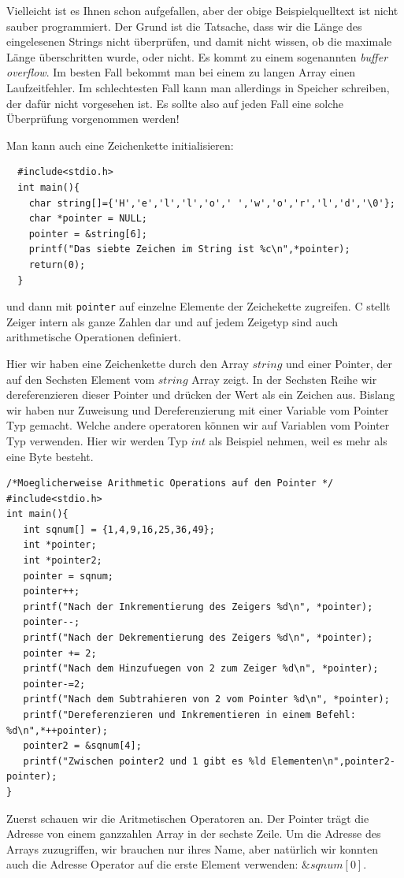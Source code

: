 Vielleicht ist es Ihnen schon aufgefallen, aber der obige Beispielquelltext ist nicht sauber programmiert.
Der Grund ist die Tatsache, dass wir die Länge des eingelesenen Strings nicht überprüfen, und damit nicht wissen, ob die maximale Länge überschritten wurde, oder nicht.
Es kommt zu einem sogenannten \emph{buffer overflow}.
Im besten Fall bekommt man bei einem zu langen Array einen Laufzeitfehler. 
Im schlechtesten Fall kann man allerdings in Speicher schreiben, der dafür nicht vorgesehen ist.
Es sollte also auf jeden Fall eine solche Überprüfung vorgenommen werden!

Man kann auch eine Zeichenkette initialisieren:
\begin{lstlisting}
  #include<stdio.h>
  int main(){
    char string[]={'H','e','l','l','o',' ','w','o','r','l','d','\0'};
    char *pointer = NULL;
    pointer = &string[6];
    printf("Das siebte Zeichen im String ist %c\n",*pointer);
    return(0);
  }
\end{lstlisting} 
und dann mit \verb|pointer| auf einzelne Elemente der Zeichekette zugreifen.
C stellt Zeiger intern als ganze Zahlen dar und auf jedem Zeigetyp sind auch arithmetische Operationen definiert.

Hier wir haben eine Zeichenkette durch den Array $string$ und einer Pointer, der auf den Sechsten Element vom 
$string$ Array zeigt. In der Sechsten Reihe wir dereferenzieren dieser Pointer und drücken der Wert als ein 
Zeichen aus. Bislang wir haben nur Zuweisung und Dereferenzierung mit einer Variable vom Pointer Typ gemacht.
Welche andere operatoren können wir auf Variablen vom Pointer Typ verwenden. Hier wir werden Typ $int$ als Beispiel
nehmen, weil es mehr als eine Byte besteht.

\begin{lstlisting}
/*Moeglicherweise Arithmetic Operations auf den Pointer */
#include<stdio.h>
int main(){
   int sqnum[] = {1,4,9,16,25,36,49};
   int *pointer;
   int *pointer2;
   pointer = sqnum;
   pointer++;
   printf("Nach der Inkrementierung des Zeigers %d\n", *pointer);
   pointer--;
   printf("Nach der Dekrementierung des Zeigers %d\n", *pointer);
   pointer += 2;
   printf("Nach dem Hinzufuegen von 2 zum Zeiger %d\n", *pointer);
   pointer-=2;
   printf("Nach dem Subtrahieren von 2 vom Pointer %d\n", *pointer);   
   printf("Dereferenzieren und Inkrementieren in einem Befehl: %d\n",*++pointer);
   pointer2 = &sqnum[4];
   printf("Zwischen pointer2 und 1 gibt es %ld Elementen\n",pointer2-pointer);
}
\end{lstlisting}
Zuerst schauen wir die Aritmetischen Operatoren an. Der Pointer trägt die Adresse von einem 
ganzzahlen Array in der sechste Zeile. Um die Adresse des Arrays zuzugriffen, wir brauchen nur ihres Name, aber 
natürlich wir konnten auch die Adresse Operator auf die erste Element verwenden: $\&sqnum[0]$.

